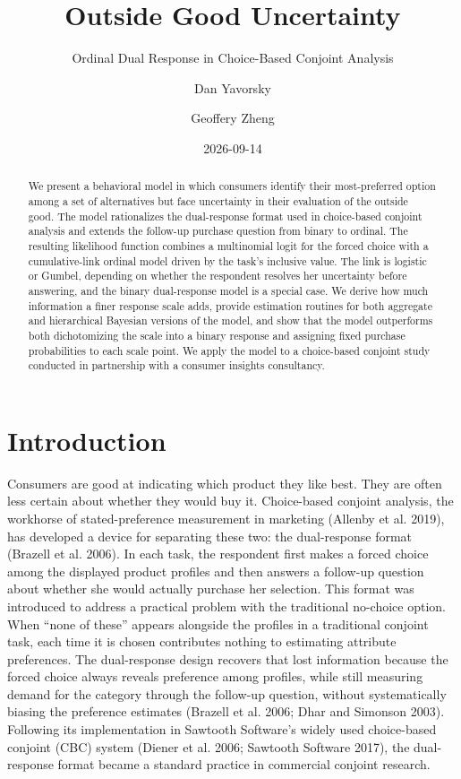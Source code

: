 \documentclass[
  letterpaper,
  DIV=11,
  numbers=noendperiod]{scrartcl}
\title{Outside Good Uncertainty}
\subtitle{Ordinal Dual Response in Choice-Based Conjoint Analysis}
\author{Dan Yavorsky \and Geoffery Zheng}
\date{2026-09-14}
\newcounter{none} %
\theoremstyle{plain}
\theoremstyle{plain}
\theoremstyle{remark}
\begin{document}
\maketitle
\begin{abstract}
We present a behavioral model in which consumers identify their
most-preferred option among a set of alternatives but face uncertainty
in their evaluation of the outside good. The model rationalizes the
dual-response format used in choice-based conjoint analysis and extends
the follow-up purchase question from binary to ordinal. The resulting
likelihood function combines a multinomial logit for the forced choice
with a cumulative-link ordinal model driven by the task's inclusive
value. The link is logistic or Gumbel, depending on whether the
respondent resolves her uncertainty before answering, and the binary
dual-response model is a special case. We derive how much information a
finer response scale adds, provide estimation routines for both
aggregate and hierarchical Bayesian versions of the model, and show that
the model outperforms both dichotomizing the scale into a binary
response and assigning fixed purchase probabilities to each scale point.
We apply the model to a choice-based conjoint study conducted in
partnership with a consumer insights consultancy.
\end{abstract}


  \newcommand{\x}{\mathbf{x}}
  \newcommand{\bfbeta}{\boldsymbol{\beta}}
  \newcommand{\betabar}{\bar{\bfbeta}}
  \newcommand{\bftheta}{\boldsymbol{\theta}}
  \newcommand{\iid}{\stackrel{iid}{\sim}}

\section{Introduction}\label{sec-intro}

Consumers are good at indicating which product they like best. They are
often less certain about whether they would buy it. Choice-based
conjoint analysis, the workhorse of stated-preference measurement in
marketing (Allenby et al. 2019), has developed a device for separating
these two: the dual-response format (Brazell et al. 2006). In each task,
the respondent first makes a forced choice among the displayed product
profiles and then answers a follow-up question about whether she would
actually purchase her selection. This format was introduced to address a
practical problem with the traditional no-choice option. When ``none of
these'' appears alongside the profiles in a traditional conjoint task,
each time it is chosen contributes nothing to estimating attribute
preferences. The dual-response design recovers that lost information
because the forced choice always reveals preference among profiles,
while still measuring demand for the category through the follow-up
question, without systematically biasing the preference estimates
(Brazell et al. 2006; Dhar and Simonson 2003). Following its
implementation in Sawtooth Software's widely used choice-based conjoint
(CBC) system (Diener et al. 2006; Sawtooth Software 2017), the
dual-response format became a standard practice in commercial conjoint
research.
\end{document}
